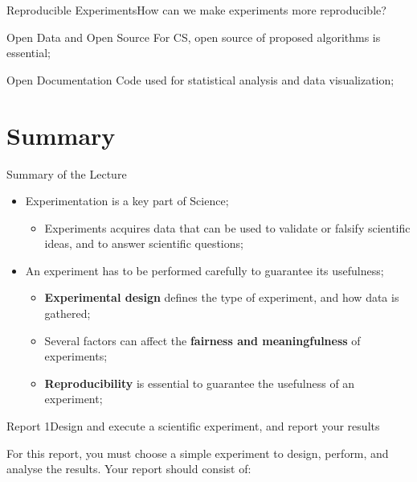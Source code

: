 \documentclass{beamer}
\begin{document}
\begin{CJK}{UTF8}{ipxm}
\begin{frame}{Reproducible Experiments}{How can we make experiments more reproducible?}
\begin{exampleblock}{Open Data and Open Source}
    For CS, open source of proposed algorithms is essential;
  \end{exampleblock}
  \begin{exampleblock}{Open Documentation}
    Code used for statistical analysis and data visualization;
  \end{exampleblock}
\end{frame}

\section{Summary}

\begin{frame}{Summary of the Lecture}
  \begin{itemize}
    \item Experimentation is a key part of Science;
    \begin{itemize}
      \item Experiments acquires data that can be used to validate or falsify scientific ideas, and to answer scientific questions;
    \end{itemize}
    \bigskip

    \item An experiment has to be performed carefully to guarantee its usefulness;
    \begin{itemize}
      \item {\bf Experimental design} defines the type of experiment, and how data is gathered;
      \item Several factors can affect the {\bf fairness and meaningfulness} of experiments;
      \item {\bf Reproducibility} is essential to guarantee the usefulness of an experiment;
    \end{itemize}
  \end{itemize}

\end{frame}

\begin{frame}{Report 1}{Design and execute a scientific experiment, and report your results}

  For this report, you must choose a simple experiment to design, perform, and analyse the results. Your report should consist of:\medskip


\end{frame}
\end{CJK}
\end{document}
